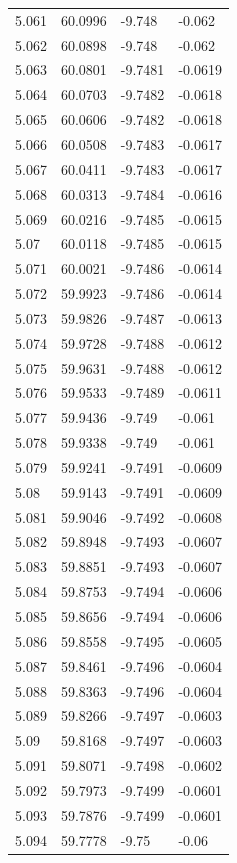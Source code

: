 \begin{tabular}{llll}
5.061 & 60.0996 & -9.748 & -0.062 \\
5.062 & 60.0898 & -9.748 & -0.062 \\
5.063 & 60.0801 & -9.7481 & -0.0619 \\
5.064 & 60.0703 & -9.7482 & -0.0618 \\
5.065 & 60.0606 & -9.7482 & -0.0618 \\
5.066 & 60.0508 & -9.7483 & -0.0617 \\
5.067 & 60.0411 & -9.7483 & -0.0617 \\
5.068 & 60.0313 & -9.7484 & -0.0616 \\
5.069 & 60.0216 & -9.7485 & -0.0615 \\
5.07 & 60.0118 & -9.7485 & -0.0615 \\
5.071 & 60.0021 & -9.7486 & -0.0614 \\
5.072 & 59.9923 & -9.7486 & -0.0614 \\
5.073 & 59.9826 & -9.7487 & -0.0613 \\
5.074 & 59.9728 & -9.7488 & -0.0612 \\
5.075 & 59.9631 & -9.7488 & -0.0612 \\
5.076 & 59.9533 & -9.7489 & -0.0611 \\
5.077 & 59.9436 & -9.749 & -0.061 \\
5.078 & 59.9338 & -9.749 & -0.061 \\
5.079 & 59.9241 & -9.7491 & -0.0609 \\
5.08 & 59.9143 & -9.7491 & -0.0609 \\
5.081 & 59.9046 & -9.7492 & -0.0608 \\
5.082 & 59.8948 & -9.7493 & -0.0607 \\
5.083 & 59.8851 & -9.7493 & -0.0607 \\
5.084 & 59.8753 & -9.7494 & -0.0606 \\
5.085 & 59.8656 & -9.7494 & -0.0606 \\
5.086 & 59.8558 & -9.7495 & -0.0605 \\
5.087 & 59.8461 & -9.7496 & -0.0604 \\
5.088 & 59.8363 & -9.7496 & -0.0604 \\
5.089 & 59.8266 & -9.7497 & -0.0603 \\
5.09 & 59.8168 & -9.7497 & -0.0603 \\
5.091 & 59.8071 & -9.7498 & -0.0602 \\
5.092 & 59.7973 & -9.7499 & -0.0601 \\
5.093 & 59.7876 & -9.7499 & -0.0601 \\
5.094 & 59.7778 & -9.75 & -0.06 \\

\end{tabular}
